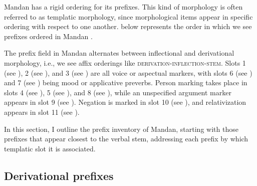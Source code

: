 Mandan has a rigid ordering for its prefixes. This kind of morphology is often referred to as templatic morphology, since morphological items appear in specific ordering with respect to one another.  below represents the order in which we see prefixes ordered in Mandan \citep[8]{kasak2019}.

\begin{table}
\caption{Prefix field in Mandan}\label{prefixfieldmandanredux}

\end{table}

The prefix field in Mandan alternates between inflectional and derivational morphology, i.e., we see affix orderings like \textsc{derivation-inflection-stem}. Slots 1 (see ), 2 (see ), and 3 (see ) are all voice or aspectual markers, with slots 6 (see ) and 7 (see ) being mood or applicative preverbs. Person marking takes place in slots 4 (see ), 5 (see ), and 8 (see ), while an unspecified argument marker appears in slot 9 (see ). Negation is marked in slot 10 (see ), and relativization appears in slot 11 (see ).

In this section, I outline the prefix inventory of Mandan, starting with those prefixes that appear closest to the verbal stem, addressing each prefix by which templatic slot it is associated.

\subsection{Derivational prefixes}\label{SubsecDerivationalPrefixes}

